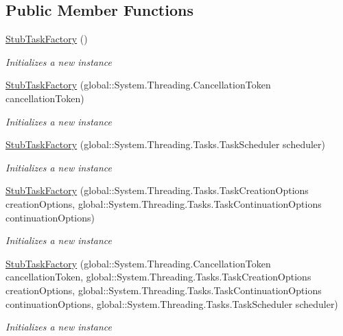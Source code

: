 \subsection*{Public Member Functions}
\begin{DoxyCompactItemize}
\item 
\hyperlink{class_system_1_1_threading_1_1_tasks_1_1_fakes_1_1_stub_task_factory_3_01_t_result_01_4_abfe29e9f502e9239b61a141e8f6021cf}{Stub\-Task\-Factory} ()
\begin{DoxyCompactList}\small\item\em Initializes a new instance\end{DoxyCompactList}\item 
\hyperlink{class_system_1_1_threading_1_1_tasks_1_1_fakes_1_1_stub_task_factory_3_01_t_result_01_4_a428e9c9c53cee4dd5bcb3489bdb44a3b}{Stub\-Task\-Factory} (global\-::\-System.\-Threading.\-Cancellation\-Token cancellation\-Token)
\begin{DoxyCompactList}\small\item\em Initializes a new instance\end{DoxyCompactList}\item 
\hyperlink{class_system_1_1_threading_1_1_tasks_1_1_fakes_1_1_stub_task_factory_3_01_t_result_01_4_a02c2233dbadbc0ec15085c865fc2952c}{Stub\-Task\-Factory} (global\-::\-System.\-Threading.\-Tasks.\-Task\-Scheduler scheduler)
\begin{DoxyCompactList}\small\item\em Initializes a new instance\end{DoxyCompactList}\item 
\hyperlink{class_system_1_1_threading_1_1_tasks_1_1_fakes_1_1_stub_task_factory_3_01_t_result_01_4_adc13e089ae7fb716e1bbefe1d03f8656}{Stub\-Task\-Factory} (global\-::\-System.\-Threading.\-Tasks.\-Task\-Creation\-Options creation\-Options, global\-::\-System.\-Threading.\-Tasks.\-Task\-Continuation\-Options continuation\-Options)
\begin{DoxyCompactList}\small\item\em Initializes a new instance\end{DoxyCompactList}\item 
\hyperlink{class_system_1_1_threading_1_1_tasks_1_1_fakes_1_1_stub_task_factory_3_01_t_result_01_4_aa4e962d449dca9c48455adabdd4596b3}{Stub\-Task\-Factory} (global\-::\-System.\-Threading.\-Cancellation\-Token cancellation\-Token, global\-::\-System.\-Threading.\-Tasks.\-Task\-Creation\-Options creation\-Options, global\-::\-System.\-Threading.\-Tasks.\-Task\-Continuation\-Options continuation\-Options, global\-::\-System.\-Threading.\-Tasks.\-Task\-Scheduler scheduler)
\begin{DoxyCompactList}\small\item\em Initializes a new instance\end{DoxyCompactList}\end{DoxyCompactItemize}
